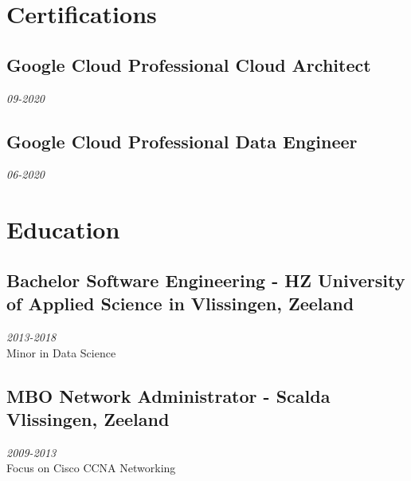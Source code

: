 \documentclass{article}
\begin{document}
\clearpage

\section{Certifications}
\subsection{Google Cloud Professional Cloud Architect}\hfill {\em 09-2020} \\
\subsection{Google Cloud Professional Data Engineer}\hfill {\em 06-2020} \\


\section{Education}
\subsection{Bachelor Software Engineering - HZ University of Applied Science in Vlissingen, Zeeland}\hfill {\em 2013-2018} \\
Minor in Data Science
\subsection{MBO Network Administrator - Scalda Vlissingen, Zeeland}\hfill {\em 2009-2013} \\
Focus on Cisco CCNA Networking
\end{document}
